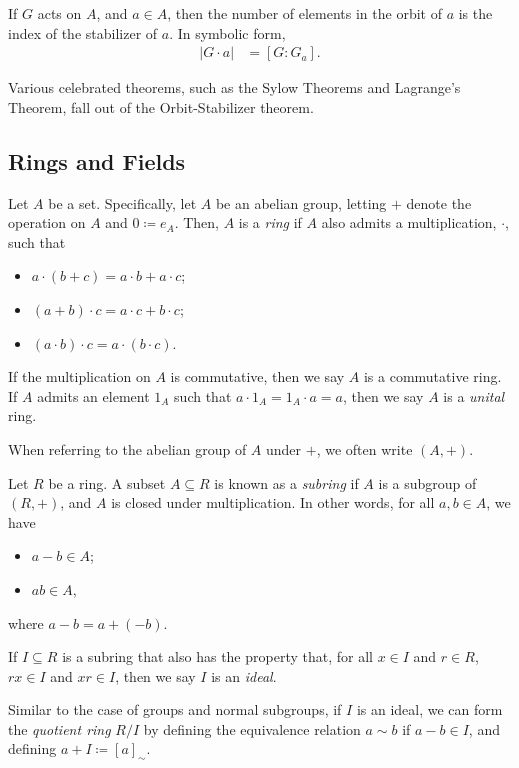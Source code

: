 \begin{theorem}
  If $G$ acts on $A$, and $a\in A$, then the number of elements in the orbit of $a$ is the index of the stabilizer of $a$. In symbolic form,
  \begin{align*}
    \left\vert G\cdot a \right\vert &= \left[G:G_a\right].
  \end{align*}
\end{theorem}
\begin{remark}
  Various celebrated theorems, such as the Sylow Theorems and Lagrange's Theorem, fall out of the Orbit-Stabilizer theorem.
\end{remark}
\subsection{Rings and Fields}%
\begin{definition}[Rings]
  Let $A$ be a set. Specifically, let $A$ be an abelian group, letting $+$ denote the operation on $A$ and $0\coloneq e_A$. Then, $A$ is a \textit{ring} if $A$ also admits a multiplication, $\cdot$, such that
  \begin{itemize}
    \item $a\cdot \left(b+c\right) = a\cdot b + a\cdot c$;
    \item $\left(a+b\right)\cdot c = a\cdot c + b\cdot c$;
    \item $\left(a\cdot b\right)\cdot c = a\cdot \left(b\cdot c\right)$.
  \end{itemize}
  If the multiplication on $A$ is commutative, then we say $A$ is a commutative ring. If $A$ admits an element $1_A$ such that $a\cdot 1_A = 1_A \cdot a = a$, then we say $A$ is a \textit{unital} ring.\newline

  When referring to the abelian group of $A$ under $+$, we often write $\left(A,+\right)$.
\end{definition}
\begin{definition}
  Let $R$ be a ring. A subset $A\subseteq R$ is known as a \textit{subring} if $A$ is a subgroup of $\left(R,+\right)$, and $A$ is closed under multiplication. In other words, for all $a,b\in A$, we have
  \begin{itemize}
    \item $a-b\in A$;
    \item $ab \in A$,
  \end{itemize}
  where $a-b = a + (-b)$.\newline

  If $I\subseteq R$ is a subring that also has the property that, for all $x\in I$ and $r\in R$, $rx\in I$ and $xr\in I$, then we say $I$ is an \textit{ideal}.\newline

  Similar to the case of groups and normal subgroups, if $I$ is an ideal, we can form the \textit{quotient ring} $R/I$ by defining the equivalence relation $a\sim b$ if $a-b\in I$, and defining $a + I\coloneq \left[a\right]_{\sim}$.
\end{definition}
